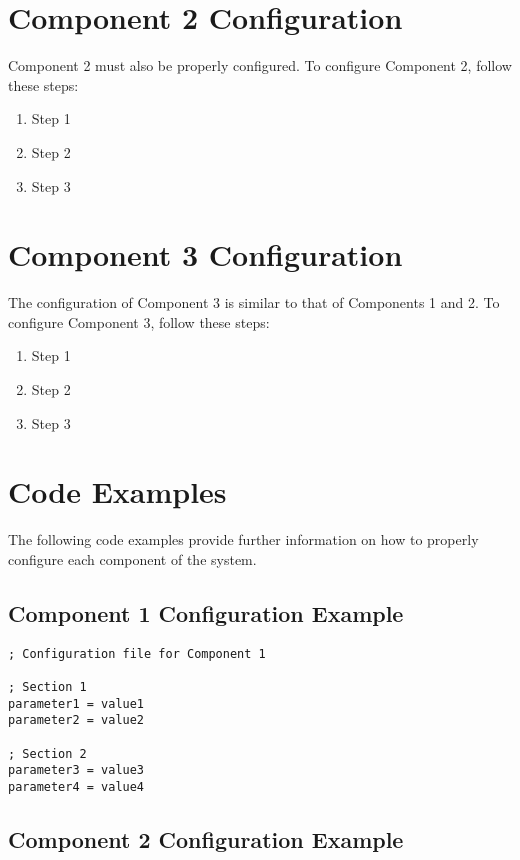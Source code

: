 \section{Component 2 Configuration}

Component 2 must also be properly configured. To configure Component 2, follow these steps:

\begin{enumerate}
    \item Step 1
    \item Step 2
    \item Step 3
\end{enumerate}

\section{Component 3 Configuration}

The configuration of Component 3 is similar to that of Components 1 and 2. To configure Component 3, follow these steps:

\begin{enumerate}
    \item Step 1
    \item Step 2
    \item Step 3
\end{enumerate}

\section{Code Examples}

The following code examples provide further information on how to properly configure each component of the system.

\subsection{Component 1 Configuration Example}

\begin{lstlisting}
; Configuration file for Component 1

; Section 1
parameter1 = value1
parameter2 = value2

; Section 2
parameter3 = value3
parameter4 = value4
\end{lstlisting}

\subsection{Component 2 Configuration Example}

